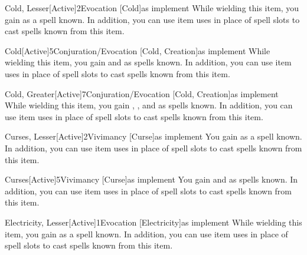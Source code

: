         \begin{magicitemdef}{Cold, Lesser}[Active]{2}{Evocation [Cold]}{as implement}
             While wielding this item, you gain  as a spell known.
            In addition, you can use item uses in place of spell slots to cast spells known from this item.
        \end{magicitemdef}

        \begin{magicitemdef}{Cold}[Active]{5}{Conjuration/Evocation [Cold, Creation]}{as implement}
             While wielding this item, you gain  and  as spells known.
            In addition, you can use item uses in place of spell slots to cast spells known from this item.
        \end{magicitemdef}

        \begin{magicitemdef}{Cold, Greater}[Active]{7}{Conjuration/Evocation [Cold, Creation]}{as implement}
             While wielding this item, you gain , , and  as spells known.
            In addition, you can use item uses in place of spell slots to cast spells known from this item.
        \end{magicitemdef}

        \begin{magicitemdef}{Curses, Lesser}[Active]{2}{Vivimancy [Curse]}{as implement}
             You gain  as a spell known.
            In addition, you can use item uses in place of spell slots to cast spells known from this item.
        \end{magicitemdef}

        \begin{magicitemdef}{Curses}[Active]{5}{Vivimancy [Curse]}{as implement}
             You gain  and  as spells known.
            In addition, you can use item uses in place of spell slots to cast spells known from this item.
        \end{magicitemdef}

        \begin{magicitemdef}{Electricity, Lesser}[Active]{1}{Evocation [Electricity]}{as implement}
             While wielding this item, you gain  as a spell known.
            In addition, you can use item uses in place of spell slots to cast spells known from this item.
        \end{magicitemdef}

